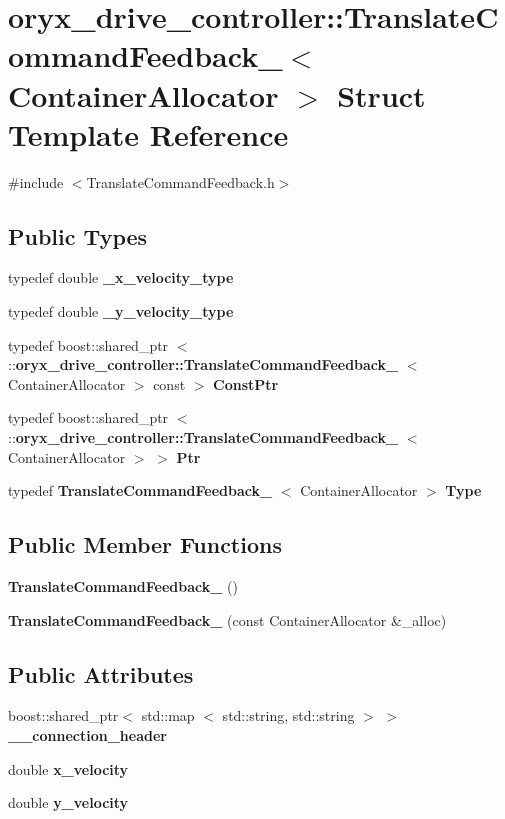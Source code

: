 \section{oryx\-\_\-drive\-\_\-controller\-:\-:\-Translate\-Command\-Feedback\-\_\-$<$ \-Container\-Allocator $>$ \-Struct \-Template \-Reference}
\label{structoryx__drive__controller_1_1TranslateCommandFeedback__}


{\ttfamily \#include $<$\-Translate\-Command\-Feedback.\-h$>$}

\subsection*{\-Public \-Types}
\begin{DoxyCompactItemize}
\item 
typedef double {\bf \-\_\-x\-\_\-velocity\-\_\-type}
\item 
typedef double {\bf \-\_\-y\-\_\-velocity\-\_\-type}
\item 
typedef boost\-::shared\-\_\-ptr\*
$<$ \-::{\bf oryx\-\_\-drive\-\_\-controller\-::\-Translate\-Command\-Feedback\-\_\-}\*
$<$ \-Container\-Allocator $>$ const  $>$ {\bf \-Const\-Ptr}
\item 
typedef boost\-::shared\-\_\-ptr\*
$<$ \-::{\bf oryx\-\_\-drive\-\_\-controller\-::\-Translate\-Command\-Feedback\-\_\-}\*
$<$ \-Container\-Allocator $>$ $>$ {\bf \-Ptr}
\item 
typedef \*
{\bf \-Translate\-Command\-Feedback\-\_\-}\*
$<$ \-Container\-Allocator $>$ {\bf \-Type}
\end{DoxyCompactItemize}
\subsection*{\-Public \-Member \-Functions}
\begin{DoxyCompactItemize}
\item 
{\bf \-Translate\-Command\-Feedback\-\_\-} ()
\item 
{\bf \-Translate\-Command\-Feedback\-\_\-} (const \-Container\-Allocator \&\-\_\-alloc)
\end{DoxyCompactItemize}
\subsection*{\-Public \-Attributes}
\begin{DoxyCompactItemize}
\item 
boost\-::shared\-\_\-ptr$<$ std\-::map\*
$<$ std\-::string, std\-::string $>$ $>$ {\bf \-\_\-\-\_\-connection\-\_\-header}
\item 
double {\bf x\-\_\-velocity}
\item 
double {\bf y\-\_\-velocity}
\end{DoxyCompactItemize}


